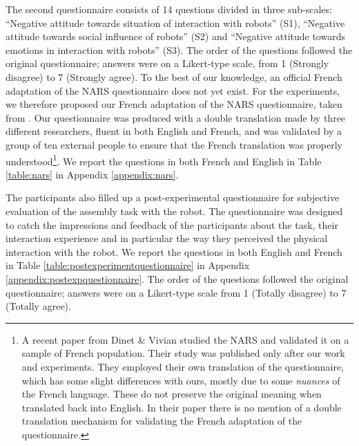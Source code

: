 \documentclass[twocolumn]{svjour3}          %
\begin{document}
The second questionnaire consists of 14 questions divided in three sub-scales: ``Negative attitude towards situation of interaction with robots'' (S1), ``Negative attitude towards social influence of robots'' (S2) and ``Negative attitude towards emotions in interaction with robots'' (S3). The order of the questions followed the original questionnaire; answers were on a Likert-type scale, from 1 (Strongly disagree) to 7 (Strongly agree).
To the best of our knowledge, an official French adaptation of the NARS questionnaire does not yet exist. 
For the experiments, we therefore proposed our French adaptation of the NARS questionnaire, taken from \cite{Nomura2006nars}. 
Our questionnaire was produced with a double translation made by three different researchers, fluent in both English and French, and was validated by a group of ten external people to ensure that the French translation was properly understood\footnote{A recent paper from Dinet \& Vivian \cite{NARSfrench} studied the NARS and validated it on a sample of French population. Their study was published only after our work and experiments. They employed their own translation of the questionnaire, which has some slight differences with ours, mostly due to some \textit{nuances} of the French language. These do not preserve the original meaning when translated back into English. In their paper there is no mention of a double translation mechanism for validating the French adaptation of the questionnaire.}.
We report the questions in both French and English in Table \ref{table:nars} in Appendix \ref{appendix:nars}.


The participants also filled up a post-experimental questionnaire for subjective evaluation of the assembly task with the robot.
The questionnaire was designed to catch the impressions and feedback of the participants about the task, their interaction experience and in particular the way they perceived the physical interaction with the robot. 
We report the questions in both English and French in Table \ref{table:postexperimentquestionnaire} in Appendix \ref{appendix:postexpquestionnaire}. 
The order of the questions followed the original questionnaire; answers were on a Likert-type scale from 1 (Totally disagree) to 7 (Totally agree). 
\end{document}
